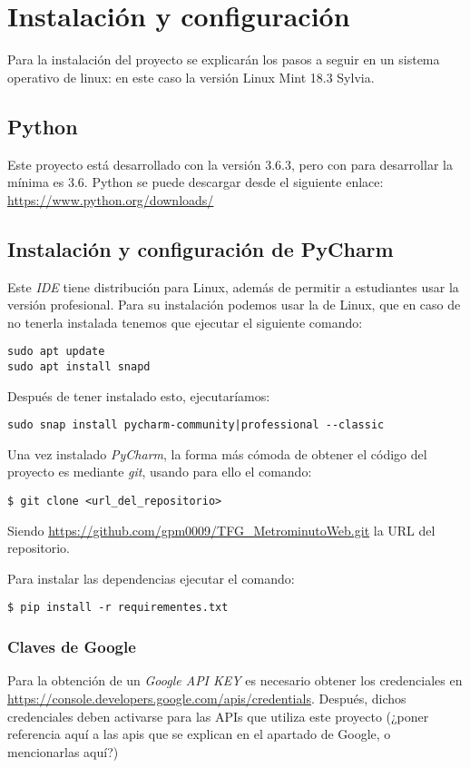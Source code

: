 \section{Instalación y configuración}
Para la instalación del proyecto se explicarán los pasos a seguir en un sistema operativo de linux: en este caso la versión Linux Mint 18.3 Sylvia.

\subsection{Python}

Este proyecto está desarrollado con la versión 3.6.3, pero con para desarrollar 
la mínima es 3.6. Python se puede descargar desde el siguiente enlace: 
\url{https://www.python.org/downloads/}

\subsection{Instalación y configuración de PyCharm}
Este \textit{IDE} tiene distribución para Linux, además de permitir a estudiantes usar la versión profesional. Para su instalación podemos usar la \cite{snap store} de Linux, que en caso de no tenerla instalada tenemos que ejecutar el siguiente comando:

\begin{lstlisting}
sudo apt update
sudo apt install snapd
\end{lstlisting}
Después de tener instalado esto, ejecutaríamos:
\begin{lstlisting}
sudo snap install pycharm-community|professional --classic
\end{lstlisting}

Una vez instalado \textit{PyCharm}, la forma más cómoda de obtener el código del proyecto es mediante \textit{git}, usando para ello el comando:
\begin{lstlisting}
$ git clone <url_del_repositorio>
\end{lstlisting}
Siendo \url{https://github.com/gpm0009/TFG_MetrominutoWeb.git} la URL del 
repositorio.

Para instalar las dependencias ejecutar el comando:
\begin{lstlisting}
$ pip install -r requirementes.txt
\end{lstlisting}

\subsubsection{Claves de Google}
Para la obtención de un \textit{Google API KEY} es necesario obtener los credenciales en  \url{https://console.developers.google.com/apis/credentials}.
Después, dichos credenciales deben activarse para las APIs que utiliza este proyecto (¿poner referencia aquí a las apis que se explican en el apartado de Google, o mencionarlas aquí?)

